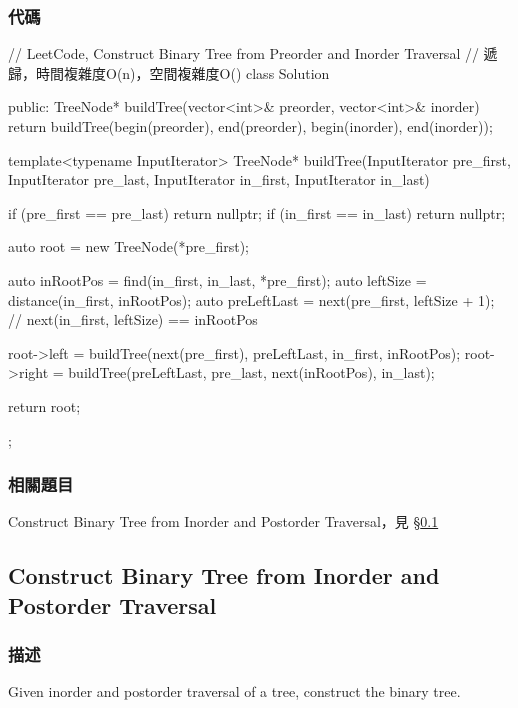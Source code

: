 \subsubsection{代碼}
\begin{Code}
// LeetCode, Construct Binary Tree from Preorder and Inorder Traversal
// 遞歸，時間複雜度O(n)，空間複雜度O(\logn)
class Solution {
public:
    TreeNode* buildTree(vector<int>& preorder, vector<int>& inorder) {
        return buildTree(begin(preorder), end(preorder),
                begin(inorder), end(inorder));
    }

    template<typename InputIterator>
    TreeNode* buildTree(InputIterator pre_first, InputIterator pre_last,
            InputIterator in_first, InputIterator in_last) {
        if (pre_first == pre_last) return nullptr;
        if (in_first == in_last) return nullptr;

        auto root = new TreeNode(*pre_first);

        auto inRootPos = find(in_first, in_last, *pre_first);
        auto leftSize = distance(in_first, inRootPos);
        auto preLeftLast = next(pre_first, leftSize + 1);
        // next(in_first, leftSize) == inRootPos

        root->left = buildTree(next(pre_first), preLeftLast, in_first, inRootPos);
        root->right = buildTree(preLeftLast, pre_last, next(inRootPos), in_last);

        return root;
    }
};
\end{Code}


\subsubsection{相關題目}
\begindot
\item Construct Binary Tree from Inorder and Postorder Traversal，見 \S \ref{sec:construct-binary-tree-from-inorder-and-postorder-traversal}
\myenddot


\subsection{Construct Binary Tree from Inorder and Postorder Traversal}
\label{sec:construct-binary-tree-from-inorder-and-postorder-traversal}


\subsubsection{描述}
Given inorder and postorder traversal of a tree, construct the binary tree.

